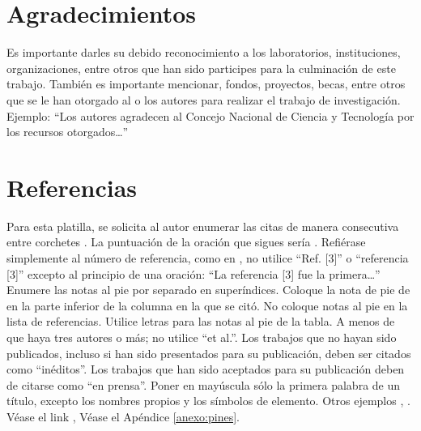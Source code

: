  \section{Agradecimientos}
  
  Es importante darles su debido reconocimiento a los laboratorios, instituciones, organizaciones, entre otros que han sido participes para la culminación de este trabajo. También es importante mencionar, fondos, proyectos, becas, entre otros que se le han otorgado al o los autores para realizar el trabajo de investigación. Ejemplo: “Los autores agradecen al Concejo Nacional de Ciencia y Tecnología por los recursos otorgados…”
  
  \section*{Referencias}
  
  Para esta platilla, se solicita al autor enumerar las citas de manera consecutiva entre corchetes \cite{YLi2013}. 
  La puntuación de la oración que sigues sería \cite{Mesaelides2011}. 
  Refiérase simplemente al número de referencia, como en \cite{Morales2012}, no utilice “Ref. [3]” o “referencia [3]” excepto al principio de una oración: “La referencia [3] fue la primera…”
  Enumere las notas al pie por separado en superíndices. Coloque la nota de pie de en la parte inferior de la columna en la que se citó. No coloque notas al pie en la lista de referencias. Utilice letras para las notas al pie de la tabla.
  A menos de que haya tres autores o más; no utilice “et al.”. Los trabajos que no hayan sido publicados, incluso si han sido presentados para su publicación, deben ser citados como “inéditos”. Los trabajos que han sido aceptados para su publicación deben de citarse como “en prensa”. Poner en mayúscula sólo la primera palabra de un título, excepto los nombres propios y los símbolos de elemento. 
  Otros ejemplos \cite{LAAngeles2021}, \cite{LAAngelesConni}. 
  Véase el link \cite{prueba}, Véase el Apéndice \ref{anexo:pines}.
  
  
  
